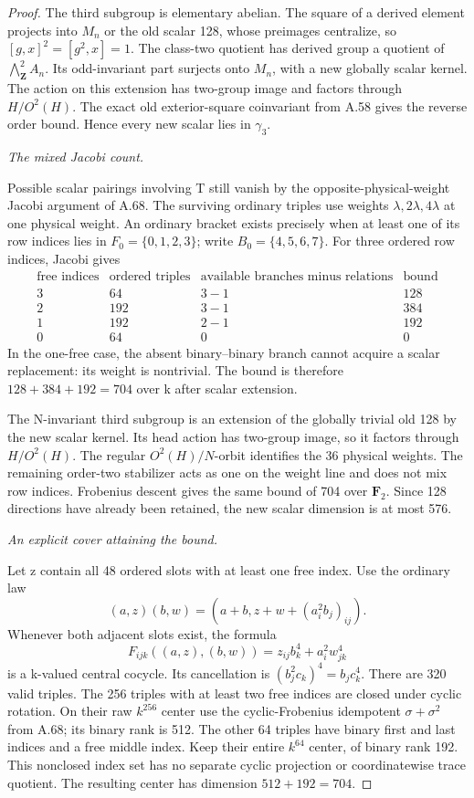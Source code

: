 \begin{proof}
The third subgroup is elementary abelian. The square of a derived
element projects into \(M_n\) or the old scalar 128, whose preimages
centralize, so
\( [g,x]^2=[g^2,x]=1\).
The class-two quotient has derived group a quotient of
\(\bigwedge^2_{\mathbf Z}A_n\). Its odd-invariant part surjects
onto \(M_n\), with a new globally scalar kernel. The action on
this extension has two-group image and factors through
\(H/O^2(H)\). The exact old exterior-square coinvariant from A.58
gives the reverse order bound. Hence every new scalar lies in
\(\gamma_3\).

\emph{The mixed Jacobi count.}\par
Possible scalar pairings involving T still vanish by the
opposite-physical-weight Jacobi argument of A.68. The surviving
ordinary triples use weights \(\lambda,2\lambda,4\lambda\) at one
physical weight. An ordinary bracket exists precisely when at least
one of its row indices lies in \(F_0=\{0,1,2,3\}\); write
\(B_0=\{4,5,6,7\}\). For three ordered row indices, Jacobi gives
\[
\begin{array}{c|c|c|c}
 \text{free indices}&\text{ordered triples}&
 \text{available branches minus relations}&\text{bound}\\ \hline
 3&64&3-1&128\\
 2&192&3-1&384\\
 1&192&2-1&192\\
 0&64&0&0
\end{array}
 \tag{A.73.3}
\]
In the one-free case, the absent binary--binary branch cannot acquire
a scalar replacement: its weight is nontrivial. The bound is therefore
\(128+384+192=704\) over k after scalar extension.

The N-invariant third subgroup is an extension of the globally trivial
old 128 by the new scalar kernel. Its head action has two-group image,
so it factors through \(H/O^2(H)\). The regular
\(O^2(H)/N\)-orbit identifies the 36 physical weights. The remaining
order-two stabilizer acts as one on the weight line and does not mix
row indices. Frobenius descent gives the same bound of 704 over
\(\mathbf F_2\). Since 128 directions have already been retained,
the new scalar dimension is at most 576.

\emph{An explicit cover attaining the bound.}\par
Let z contain all 48 ordered slots with at least one free index.
Use the ordinary law
\[
 (a,z)(b,w)=(a+b,z+w+(a_i^2b_j)_{ij}).
\]
Whenever both adjacent slots exist, the formula
\[
 F_{ijk}((a,z),(b,w))=z_{ij}b_k^4+a_i^2w_{jk}^4
 \tag{A.73.4}
\]
is a k-valued central cocycle. Its cancellation is
\((b_j^2c_k)^4=b_jc_k^4\). There are 320 valid triples.
The 256 triples with at least two free indices are closed under
cyclic rotation. On their raw \(k^{256}\) center use the
cyclic-Frobenius idempotent \(\sigma+\sigma^2\) from A.68; its
binary rank is 512. The other 64 triples have binary first and last
indices and a free middle index. Keep their entire \(k^{64}\)
center, of binary rank 192. This nonclosed index set has no separate
cyclic projection or coordinatewise trace quotient. The resulting
center has dimension \(512+192=704\).


\end{proof}

